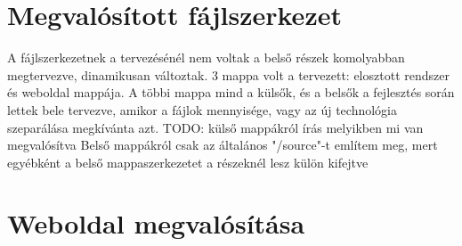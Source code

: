 \section{Megvalósított fájlszerkezet}
	A fájlszerkezetnek a tervezésénél nem voltak a belső részek komolyabban megtervezve, dinamikusan változtak. 3 mappa volt a tervezett: elosztott rendszer és weboldal mappája. A többi mappa mind a külsők, és a belsők a fejlesztés során lettek bele tervezve, amikor a fájlok mennyisége, vagy az új technológia szeparálása megkívánta azt. 
	TODO: külső mappákról írás melyikben mi van megvalósítva
	Belső mappákról csak az általános "/source"-t említem meg, mert egyébként a belső mappaszerkezetet a részeknél lesz külön kifejtve

\section{Weboldal megvalósítása}
